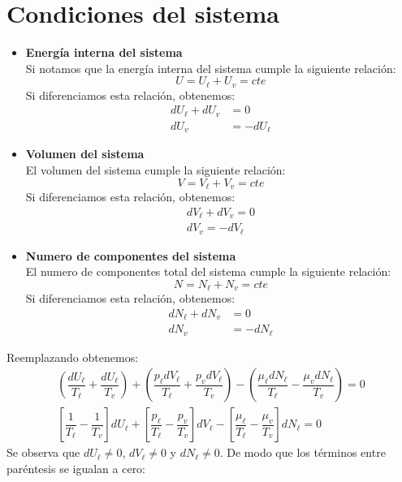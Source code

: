 \documentclass[../main]{subfiles}
\begin{document}
\section{Condiciones del sistema}
\begin{itemize}
    \item \textbf{Energía interna del sistema} \\[0.3cm]
          Si notamos que la energía interna del sistema cumple la siguiente relación:
          \begin{equation}
              U=U_{\ell}+U_v=cte
          \end{equation}
          Si diferenciamos esta relación, obtenemos:
          \begin{align}
              dU_{\ell}+dU_v & =0          \\
              dU_v           & =-dU_{\ell}
          \end{align}
    \item \textbf{Volumen del sistema}\\[0.3cm]
          El volumen del sistema cumple la siguiente relación:
          \begin{equation}
              V=V_{\ell}+V_v=cte
          \end{equation}
          Si diferenciamos esta relación, obtenemos:
          \begin{align}
              dV_{\ell}+dV_v=0 \\
              dV_v=-dV_{\ell}
          \end{align}
    \item \textbf{Numero de componentes del sistema} \\[0.3cm]
          El numero de componentes total del sistema cumple la siguiente relación:
          \begin{equation}
              N=N_{\ell}+N_v=cte
          \end{equation}
          Si diferenciamos esta relación, obtenemos:
          \begin{align}
              dN_{\ell}+dN_v & =0          \\
              dN_v           & =-dN_{\ell}
          \end{align}
\end{itemize}
Reemplazando obtenemos:
\begin{align}
    \left( \dfrac{dU_{\ell}}{T_{\ell}}+ \dfrac{dU_{\ell}}{T_v} \right)+\left( \dfrac{p_{\ell}dV_{\ell}}{T_{\ell}}+\dfrac{p_v dV_{\ell}}{T_v} \right)-\left( \dfrac{\mu_{\ell} dN_{\ell}}{T_{\ell}}-\dfrac{\mu_v dN_{\ell}}{T_v} \right)=0 \\
    \left[ \dfrac{1}{T_{\ell}}-\dfrac{1}{T_v} \right]dU_{\ell}+\left[ \dfrac{p_{\ell}}{T_{\ell}}-\dfrac{p_v}{T_v} \right]dV_{\ell}-\left[ \dfrac{\mu_{\ell}}{T_{\ell}}-\dfrac{\mu_v}{T_v} \right]dN_{\ell}=0
\end{align}
Se observa que $dU_{\ell} \neq 0$, $dV_{\ell} \neq 0$ y $dN_{\ell} \neq 0$. De modo que los términos entre paréntesis se igualan a cero:
\end{document}
